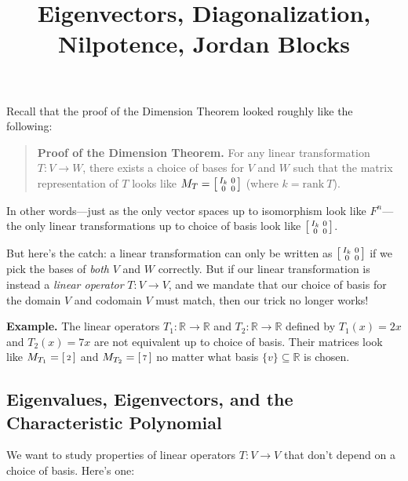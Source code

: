 \title{Eigenvectors, Diagonalization, Nilpotence, Jordan Blocks}



Recall that the proof of the Dimension Theorem looked roughly like the following:
\begin{quote}
    \textbf{Proof of the Dimension Theorem.} For any linear transformation $T: V \to W$, there exists a choice of bases for $V$ and $W$ such that the matrix representation of $T$ looks like $M_T = \begin{bsmallmatrix} I_k & 0 \\ 0 & 0 \end{bsmallmatrix}$ (where $k = \mathrm{rank} \ T$).
\end{quote}
In other words---just as the only vector spaces up to isomorphism look like $F^n$---the only linear transformations up to choice of basis look like $\begin{bsmallmatrix} I_k & 0 \\ 0 & 0 \end{bsmallmatrix}$.

But here's the catch: a linear transformation can only be written as $\begin{bsmallmatrix} I_k & 0 \\ 0 & 0 \end{bsmallmatrix}$ if we pick the bases of \emph{both} $V$ and $W$ correctly.  But if our linear transformation is instead a \emph{linear operator} $T: V \to V$, and we mandate that our choice of basis for the domain $V$ and codomain $V$ must match, then our trick no longer works!

\textbf{Example.} The linear operators $T_1: \mathbb{R} \to \mathbb{R}$ and $T_2: \mathbb{R} \to \mathbb{R}$ defined by $T_1(x) = 2x$ and $T_2(x) = 7x$ are not equivalent up to choice of basis.  Their matrices look like $M_{T_1} = \begin{bsmallmatrix} 2 \end{bsmallmatrix}$ and $M_{T_2} = \begin{bsmallmatrix} 7 \end{bsmallmatrix}$ no matter what basis $\{v\} \subseteq \mathbb{R}$ is chosen.

\subsection{Eigenvalues, Eigenvectors, and the Characteristic Polynomial}

We want to study properties of linear operators $T: V \to V$ that don't depend on a choice of basis.  Here's one:

